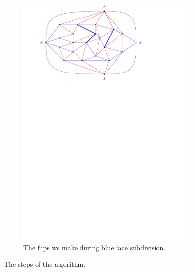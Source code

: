\begin{figure}
    \begin{subfigure}[b]{.9 \textwidth}
      \includegraphics[width=\textwidth]{examples/img/smallExample/smallExample-8}
      \caption{The flips we make during blue face subdivision.}
      \label{fig:ex:simple:8}
    \end{subfigure}
  \caption{The steps of the algorithm.}
  \label{fig:ex:simple}

\end{figure}




